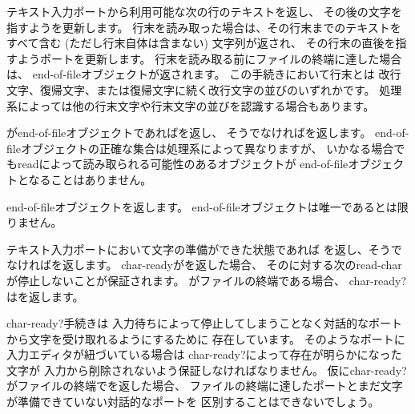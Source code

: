 \begin{entry}{%
}

テキスト入力ポートから利用可能な次の行のテキストを返し、
その後の文字を指すようを更新します。
行末を読み取った場合は、その行末までのテキストをすべて含む
(ただし行末自体は含まない) 文字列が返され、
その行末の直後を指すようポートを更新します。
行末を読み取る前にファイルの終端に達した場合は、
end-of-fileオブジェクトが返されます。
この手続きにおいて行末とは
改行文字、復帰文字、または復帰文字に続く改行文字の並びのいずれかです。
処理系によっては他の行末文字や行末文字の並びを認識する場合もあります。

\end{entry}


\begin{entry}{%
}

がend-of-fileオブジェクトであれば\schtrue{}を返し、
そうでなければ\schfalse{}を返します。
end-of-fileオブジェクトの正確な集合は処理系によって異なりますが、
いかなる場合でも{\cf read}によって読み取られる可能性のあるオブジェクトが
end-of-fileオブジェクトとなることはありません。

\end{entry}

\begin{entry}{%
}

end-of-fileオブジェクトを返します。
end-of-fileオブジェクトは唯一であるとは限りません。

\end{entry}


\begin{entry}{%
}

テキスト入力ポートにおいて文字の準備ができた状態であれば
\schtrue{}を返し、そうでなければ\schfalse{}を返します。
{\cf char-ready}が\schtrue{}を返した場合、
そのに対する次の{\cf read-char}が停止しないことが保証されます。
がファイルの終端である場合、
{\cf char-ready?}は\schtrue{}を返します。

\begin{rationale}
{\cf char-ready?}手続きは
入力待ちによって停止してしまうことなく対話的なポートから文字を受け取れるようにするために
存在しています。
そのようなポートに入力エディタが紐づいている場合は
{\cf char-ready?}によって存在が明らかになった文字が
入力から削除されないよう保証しなければなりません。
仮に{\cf char-ready?}がファイルの終端で\schfalse{}を返した場合、
ファイルの終端に達したポートとまだ文字が準備できていない対話的なポートを
区別することはできないでしょう。
\end{rationale}
\end{entry}


